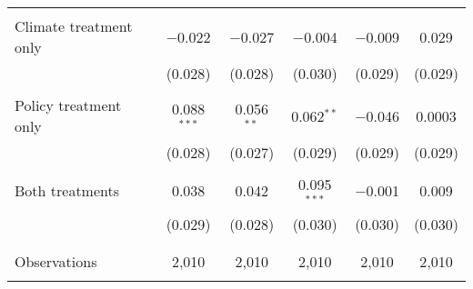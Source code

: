 \begin{tabular}{@{\extracolsep{5pt}}lccccc}
  & & & & & \\ 
 Climate treatment only & $-$0.022 & $-$0.027 & $-$0.004 & $-$0.009 & 0.029 \\ 
  & (0.028) & (0.028) & (0.030) & (0.029) & (0.029) \\ 
  & & & & & \\ 
 Policy treatment only & 0.088$^{***}$ & 0.056$^{**}$ & 0.062$^{**}$ & $-$0.046 & 0.0003 \\ 
  & (0.028) & (0.027) & (0.029) & (0.029) & (0.029) \\ 
  & & & & & \\ 
 Both treatments & 0.038 & 0.042 & 0.095$^{***}$ & $-$0.001 & 0.009 \\ 
  & (0.029) & (0.028) & (0.030) & (0.030) & (0.030) \\ 
  & & & & & \\ 
\hline \\[-1.8ex] 

Observations & 2,010 & 2,010 & 2,010 & 2,010 & 2,010 \\ 
\hline 
\hline \\[-1.8ex] 
\end{tabular} 